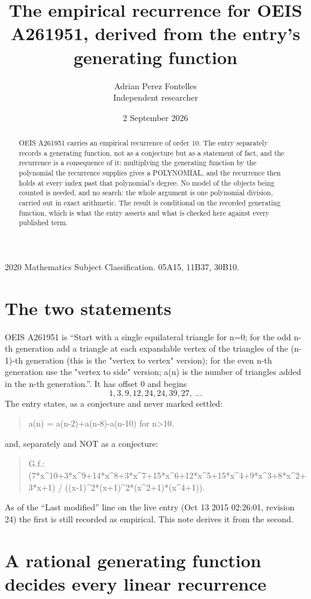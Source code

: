\documentclass[11pt,a4paper]{article}
\title{The empirical recurrence for OEIS A261951, derived from the entry's generating function}
\author{Adrian Perez Fontelles\\ \small Independent researcher}
\date{2 September 2026}
\theoremstyle{plain}
\theoremstyle{definition}
\begin{document}
\maketitle

\begin{abstract}
OEIS A261951 carries an empirical recurrence of order $10$. The entry separately records a
generating function, not as a conjecture but as a statement of fact, and the recurrence is a
consequence of it: multiplying the generating function by the polynomial the recurrence
supplies gives a POLYNOMIAL, and the recurrence then holds at every index past that
polynomial's degree. No model of the objects being counted is needed, and no search: the
whole argument is one polynomial division, carried out in exact arithmetic. The result is
conditional on the recorded generating function, which is what the entry asserts and what is
checked here against every published term.
\end{abstract}

\noindent\small 2020 Mathematics Subject Classification. 05A15, 11B37, 30B10.\normalsize

\section{The two statements}

OEIS A261951 is ``Start with a single equilateral triangle for n=0; for the odd n-th generation add a triangle at each expandable vertex of the triangles of the (n-1)-th generation (this is the "vertex to vertex" version); for the even n-th generation use the "vertex to side" version; a(n) is the number of triangles added in the n-th generation.''. It has offset $0$ and begins
\[
1, 3, 9, 12, 24, 24, 39, 27,\ \dots
\]
The entry states, as a conjecture and never marked settled:
\begin{quote}
a(n) = a(n-2)+a(n-8)-a(n-10) for n>10.
\end{quote}
and, separately and NOT as a conjecture:
\begin{quote}
G.f.: (7*x\^{}10+3*x\^{}9+14*x\^{}8+3*x\^{}7+15*x\^{}6+12*x\^{}5+15*x\^{}4+9*x\^{}3+8*x\^{}2+3*x+1) / ((x-1)\^{}2*(x+1)\^{}2*(x\^{}2+1)*(x\^{}4+1)).
\end{quote}
As of the ``Last modified'' line on the live entry (Oct 13 2015 02:26:01, revision 24) the first is still
recorded as empirical. This note derives it from the second.

\section{A rational generating function decides every linear recurrence}
\end{document}
